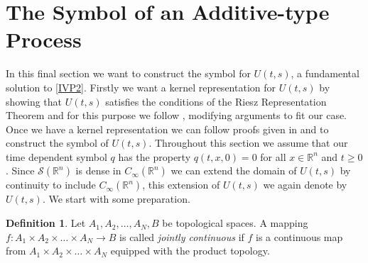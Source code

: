 \documentclass[a4paper, 12pt]{report}
\theoremstyle{remark}
\theoremstyle{definition}
\newtheorem{definition}[theorem]{Definition}
\begin{document}
\section{The Symbol of an Additive-type Process}

In this final section we want to construct the symbol for $U(t, s)$, a fundamental solution to \eqref{IVP2}.  Firstly we want a kernel representation for $U(t, s)$ by showing that $U(t, s)$ satisfies the conditions of the Riesz Representation Theorem and for this purpose we follow \cite{KernelPaper}, modifying arguments to fit our case.  Once we have a kernel representation we can follow proofs given in \cite{SymbolPaper} and \cite{Conservative} to construct the symbol of $U(t, s)$.  Throughout this section we assume that our time dependent symbol $q$ has the property $q(t, x, 0) = 0$ for all $x \in \mathbb{R}^n$ and $t \ge 0$.  Since $\mathcal{S}(\mathbb{R}^n)$ is dense in $C_\infty(\mathbb{R}^n)$ we can extend the domain of $U(t, s)$ by continuity to include $C_\infty(\mathbb{R}^n)$, this extension of $U(t, s)$ we again denote by $U(t, s)$.  We start with some preparation.
\begin{definition}
Let $A_1, A_2, \dots, A_N, B$ be topological spaces.  A mapping $f : A_1 \times A_2 \times \dots \times A_N \to B$ is called \emph{jointly continuous} if $f$ is a continuous map from $A_1 \times A_2 \times \dots \times A_N$ equipped with the product topology.
\end{definition}
\end{document}
